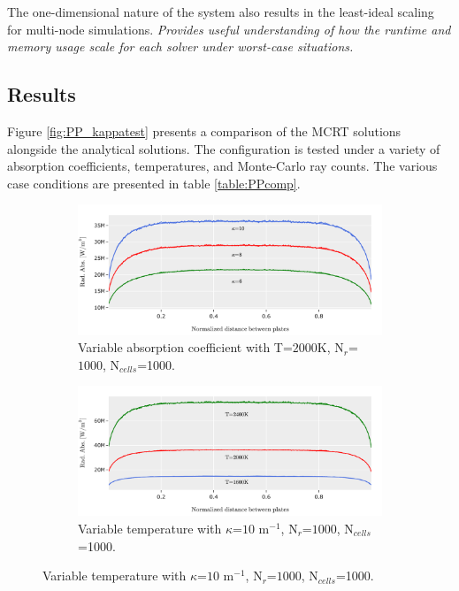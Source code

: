 The one-dimensional nature of the system also results in the least-ideal scaling for multi-node simulations. \textit{Provides useful understanding of how the runtime and memory usage scale for each solver under worst-case situations.}

\subsection{Results}
Figure \ref{fig:PP_kappatest} presents a comparison of the MCRT solutions alongside the analytical solutions. The configuration is tested under a variety of absorption coefficients, temperatures, and Monte-Carlo ray counts. The various case conditions are presented in table \ref{table:PPcomp}.

\begin{figure}
  \begin{subfigure}{1\textwidth}
  \includegraphics[width=\linewidth]{figures/ch4/PPcomparison1.png}
  \caption{Variable absorption coefficient with T=$2000$K, N$_r$=$1000$, N$_{cells}$=1000.}
  \label{fig:PPcomp_kappa}
  \end{subfigure}
  \begin{subfigure}{1\textwidth}
  \includegraphics[width=\linewidth]{figures/ch4/PPcomparison2.png}
  \caption{Variable temperature with $\kappa{}$=$10$ m$^{-1}$, N$_r$=$1000$, N$_{cells}$=1000.}
  \label{fig:PPcomp_temp}
  \end{subfigure}

\end{figure}
